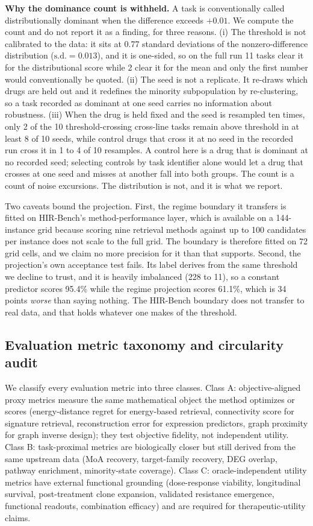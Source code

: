 \documentclass[11pt,letterpaper]{article}
\newcommand{\CONTROLRANGE}{1 to 4}
\begin{document}
\textbf{Why the dominance count is withheld.} A task is conventionally called
distributionally dominant when the difference exceeds $+0.01$. We compute the count and do
not report it as a finding, for three reasons. (i) The threshold is not calibrated to the
data: it sits at 0.77 standard deviations of the nonzero-difference distribution
($\mathrm{s.d.} = 0.013$), and it is one-sided, so on the full run 11 tasks clear it for the distributional score
while 2 clear it for the mean and only the first number would conventionally be quoted.
(ii) The seed is not a replicate. It re-draws which drugs are held out and it redefines the
minority subpopulation by re-clustering, so a task recorded as dominant at one seed carries
no information about robustness. (iii) When the drug is held fixed and the seed is resampled
ten times, only 2 of the 10 threshold-crossing cross-line tasks remain above threshold in at
least 8 of 10 seeds, while control drugs that cross it at no seed in the recorded run cross
it in \CONTROLRANGE{} of 10 resamples. A control here is a drug that is dominant at no
recorded seed; selecting controls by task identifier alone would let a drug that crosses at
one seed and misses at another fall into both groups. The count is a count of noise
excursions. The distribution is not, and it is what we report.

Two caveats bound the projection. First, the regime boundary it
transfers is fitted on HIR-Bench's method-performance layer, which is available on a
144-instance grid because scoring nine retrieval methods against up to 100 candidates per
instance does not scale to the full grid. The boundary is therefore fitted on 72 grid cells,
and we claim no more precision for it than that supports. Second, the projection's own
acceptance test fails. Its label derives from the same threshold we decline to trust, and it is heavily imbalanced
(228 to 11), so a constant predictor scores 95.4\% while the regime projection scores 61.1\%,
which is 34 points \emph{worse} than saying nothing. The HIR-Bench boundary does not transfer
to real data, and that holds whatever one makes of the threshold.

\subsection*{Evaluation metric taxonomy and circularity audit}

We classify every evaluation metric into three classes. Class A: objective-aligned
proxy metrics measure the same mathematical object the method optimizes or scores (energy-distance
regret for energy-based retrieval, connectivity score for signature retrieval, reconstruction
error for expression predictors, graph proximity for graph inverse design); they test
objective fidelity, not independent utility. Class B: task-proximal metrics are
biologically closer but still derived from the same upstream data (MoA recovery,
target-family recovery, DEG overlap, pathway enrichment, minority-state coverage).
Class C: oracle-independent utility metrics have external functional grounding
(dose-response viability, longitudinal survival, post-treatment clone expansion, validated
resistance emergence, functional readouts, combination efficacy) and are required for
therapeutic-utility claims.
\end{document}
